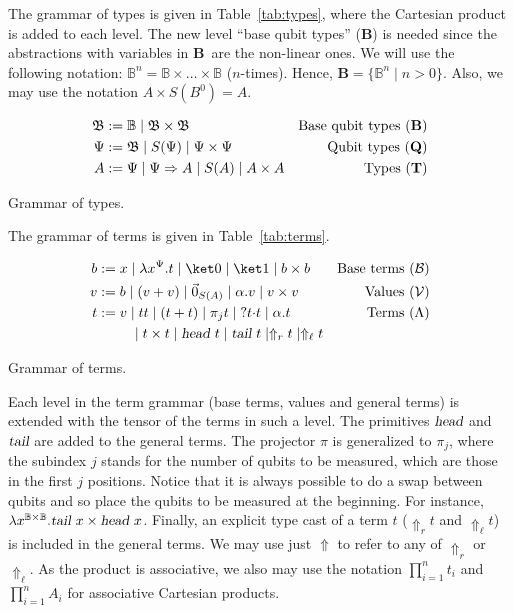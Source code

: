 \documentclass[preprint]{elsarticle}
\newcommand\B{\ensuremath{\mathbb B}}
\newcommand\Bs{\ensuremath{\mathfrak B}}
\newcommand\gB{\ensuremath{\Psi}}
\newcommand\ite[3]{{#1}?{#2}\mathord{\cdot}{#3}}
\newcommand\pair[2]{({#1}+{#2})}
\newcommand\bqtypes{\ensuremath{\mathbf B}}
\newcommand\qtypes{\ensuremath{\mathbf Q}}
\newcommand\types{\ensuremath{\mathbf T}}
\newcommand\basis{\ensuremath{\mathcal B}}
\newcommand\values{\ensuremath{\mathcal V}}
\newcommand\head{\text{\sl head}}
\newcommand\tail{\text{\sl tail}}
\newcommand\z[1][A]{\vec 0_{S(#1)}}
\begin{document}
The grammar of types is given in Table~\ref{tab:types}, where the Cartesian
product is added to each level. The new level ``base qubit types'' (\bqtypes) is needed
since the abstractions with variables in \bqtypes\ are the non-linear ones.
We will use the following notation: $\B^n=\B\times\dots\times\B$ ($n$-times).
Hence, $\bqtypes = \{\B^n\mid n>0\}$. Also, we may use the notation $A\times S(B^0)=A$.
\begin{table}
  \centering
  \begin{align*}
    \Bs &:= \B\mid\Bs\times\Bs & \textrm{Base qubit types (\bqtypes)}\\
    \gB &:=\Bs\mid S(\gB)\mid\gB\times\gB & \textrm{Qubit types (\qtypes)}\\
    A & := \gB\mid\gB\Rightarrow A\mid S(A)\mid A\times A & \textrm{Types (\types)}
  \end{align*}
  \caption{Grammar of types.}
  \label{tab:types}
\end{table}

The grammar of terms is given in Table~\ref{tab:terms}.
\begin{table}
  \centering
  \begin{align*}
    b  & := x\mid \lambda x^{\gB}.t\mid \ket 0\mid \ket 1\mid b\times b & \textrm{Base terms (\basis)}
    \\
    v  & := b\mid \pair vv\mid \z\mid \alpha.v\mid v\times v & \textrm{Values (\values)}
    \\
    t  & := v\mid tt\mid \pair tt\mid \pi_j t\mid \ite{}tt\mid \alpha.t & \textrm{Terms ($\Lambda$)}\\
    &\hspace{8.5mm}\mid t\times t\mid \head~t\mid \tail~t\mid \Uparrow_r t\mid\Uparrow_\ell t
  \end{align*}
  \caption{Grammar of terms.}
  \label{tab:terms}
\end{table}

Each level in the term grammar (base terms, values and general terms) is
extended with the tensor of the terms in such a level. The primitives $\head$
and $\tail$ are added to the general terms. The projector $\pi$ is generalized
to $\pi_j$, where the subindex $j$ stands for the number of qubits to be
measured, which are those in the first $j$ positions.
Notice that it is always possible to do a swap between qubits and so place the
qubits to be measured at the beginning. For instance, $\lambda x^{\B \times
  \B}.\tail~x\times\head~x$.
Finally, an explicit type cast of a term $t$ ($\Uparrow_rt$ and $\Uparrow_\ell t$) is included in the
general terms. We may use just $\Uparrow$ to refer to any of $\Uparrow_r$ or
$\Uparrow_\ell$. As the product is associative, we also may use the notation $\prod_{i=1}^n t_i$ and $\prod_{i=1}^n
A_i$ for associative Cartesian products.
\end{document}
